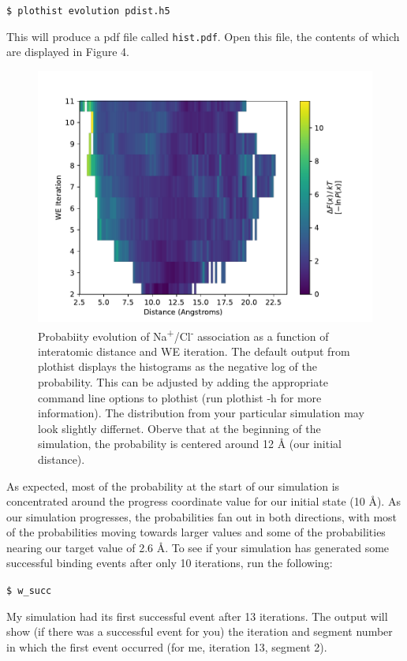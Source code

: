 \documentclass[9pt,tutorial]{livecoms}
\begin{document}
\verb|$ plothist evolution pdist.h5|

This will produce a pdf file called \verb|hist.pdf|. 
Open this file, the contents of which are displayed in Figure 4. 

\begin{figure}
\includegraphics[width=\linewidth]{Figure4.pdf}
\caption{Probabiity evolution of Na\textsuperscript{+}/Cl\textsuperscript{-} association as a function of interatomic distance and WE iteration. 
The default output from plothist displays the histograms as the negative log of the probability. 
This can be adjusted by adding the appropriate command line options to plothist (run plothist -h for more information). 
The distribution from your particular simulation may look slightly differnet. 
Oberve that at the beginning of the simulation, the probability is centered around 12 \AA{} (our initial distance).}
\label{fig:view}
\end{figure}

As expected, most of the probability at the start of our simulation is concentrated around the progress coordinate value for our initial state (10 \AA). 
As our simulation progresses, the probabilities fan out in both directions, with most of the probabilities moving towards larger values and some of the probabilities nearing our target value of 2.6 \AA. 
To see if your simulation has generated some successful binding events after only 10 iterations, run the following:

\verb|$ w_succ|
 
My simulation had its first successful event after 13 iterations. 
The output will show (if there was a successful event for you) the iteration and segment number in which the first event occurred (for me, iteration 13, segment 2).
\end{document}
